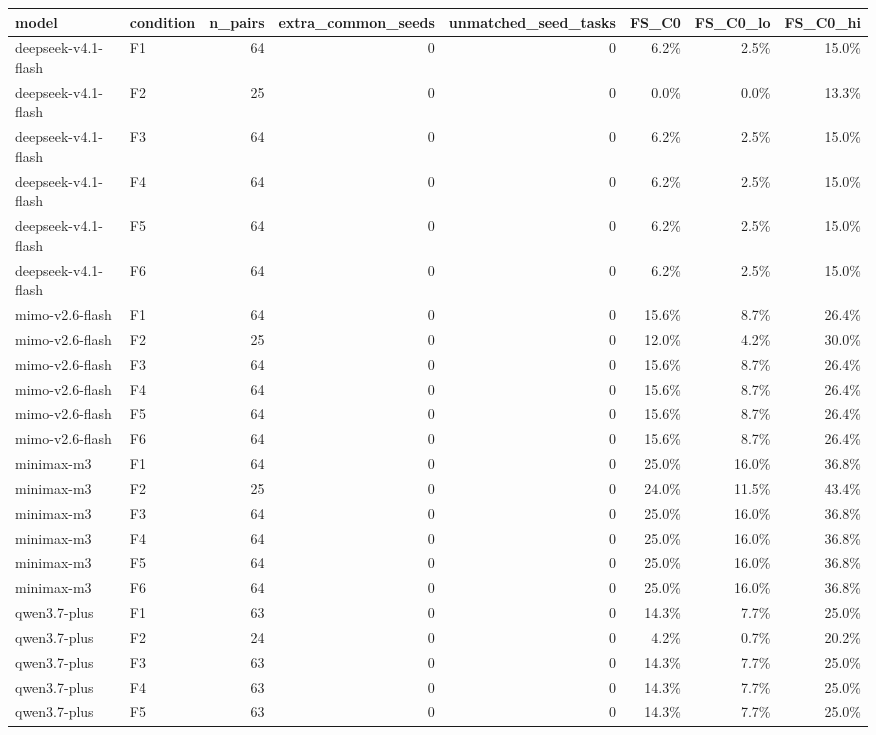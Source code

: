\begin{tabular}{llrrrrrr}
\toprule
model & condition & n\_pairs & extra\_common\_seeds & unmatched\_seed\_tasks & FS\_C0 & FS\_C0\_lo & FS\_C0\_hi \\
\midrule
deepseek-v4.1-flash & F1 & 64 & 0 & 0 & 6.2\% & 2.5\% & 15.0\% \\
deepseek-v4.1-flash & F2 & 25 & 0 & 0 & 0.0\% & 0.0\% & 13.3\% \\
deepseek-v4.1-flash & F3 & 64 & 0 & 0 & 6.2\% & 2.5\% & 15.0\% \\
deepseek-v4.1-flash & F4 & 64 & 0 & 0 & 6.2\% & 2.5\% & 15.0\% \\
deepseek-v4.1-flash & F5 & 64 & 0 & 0 & 6.2\% & 2.5\% & 15.0\% \\
deepseek-v4.1-flash & F6 & 64 & 0 & 0 & 6.2\% & 2.5\% & 15.0\% \\
mimo-v2.6-flash & F1 & 64 & 0 & 0 & 15.6\% & 8.7\% & 26.4\% \\
mimo-v2.6-flash & F2 & 25 & 0 & 0 & 12.0\% & 4.2\% & 30.0\% \\
mimo-v2.6-flash & F3 & 64 & 0 & 0 & 15.6\% & 8.7\% & 26.4\% \\
mimo-v2.6-flash & F4 & 64 & 0 & 0 & 15.6\% & 8.7\% & 26.4\% \\
mimo-v2.6-flash & F5 & 64 & 0 & 0 & 15.6\% & 8.7\% & 26.4\% \\
mimo-v2.6-flash & F6 & 64 & 0 & 0 & 15.6\% & 8.7\% & 26.4\% \\
minimax-m3 & F1 & 64 & 0 & 0 & 25.0\% & 16.0\% & 36.8\% \\
minimax-m3 & F2 & 25 & 0 & 0 & 24.0\% & 11.5\% & 43.4\% \\
minimax-m3 & F3 & 64 & 0 & 0 & 25.0\% & 16.0\% & 36.8\% \\
minimax-m3 & F4 & 64 & 0 & 0 & 25.0\% & 16.0\% & 36.8\% \\
minimax-m3 & F5 & 64 & 0 & 0 & 25.0\% & 16.0\% & 36.8\% \\
minimax-m3 & F6 & 64 & 0 & 0 & 25.0\% & 16.0\% & 36.8\% \\
qwen3.7-plus & F1 & 63 & 0 & 0 & 14.3\% & 7.7\% & 25.0\% \\
qwen3.7-plus & F2 & 24 & 0 & 0 & 4.2\% & 0.7\% & 20.2\% \\
qwen3.7-plus & F3 & 63 & 0 & 0 & 14.3\% & 7.7\% & 25.0\% \\
qwen3.7-plus & F4 & 63 & 0 & 0 & 14.3\% & 7.7\% & 25.0\% \\
qwen3.7-plus & F5 & 63 & 0 & 0 & 14.3\% & 7.7\% & 25.0\% \\

\end{tabular}
